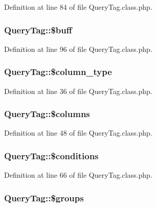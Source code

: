 Definition at line 84 of file Query\-Tag.\-class.\-php.

\hypertarget{classQueryTag_abe10d8fd334fac380dd5540b2c0bdcc8}{
\subsubsection[{\$buff}]{\setlength{\rightskip}{0pt plus 5cm}Query\-Tag\-::\$buff}}\label{classQueryTag_abe10d8fd334fac380dd5540b2c0bdcc8}


Definition at line 96 of file Query\-Tag.\-class.\-php.

\hypertarget{classQueryTag_a617db2d7a2db9fddba0959b43cc40458}{
\subsubsection[{\$column\-\_\-type}]{\setlength{\rightskip}{0pt plus 5cm}Query\-Tag\-::\$column\-\_\-type}}\label{classQueryTag_a617db2d7a2db9fddba0959b43cc40458}


Definition at line 36 of file Query\-Tag.\-class.\-php.

\hypertarget{classQueryTag_a375d57839b60d616ed27af9f42acd3a1}{
\subsubsection[{\$columns}]{\setlength{\rightskip}{0pt plus 5cm}Query\-Tag\-::\$columns}}\label{classQueryTag_a375d57839b60d616ed27af9f42acd3a1}


Definition at line 48 of file Query\-Tag.\-class.\-php.

\hypertarget{classQueryTag_a7cf9adc98dec4da0e67c1dcd25b7e5b5}{
\subsubsection[{\$conditions}]{\setlength{\rightskip}{0pt plus 5cm}Query\-Tag\-::\$conditions}}\label{classQueryTag_a7cf9adc98dec4da0e67c1dcd25b7e5b5}


Definition at line 66 of file Query\-Tag.\-class.\-php.

\hypertarget{classQueryTag_aa456465c5358ae400751727cd943683e}{
\subsubsection[{\$groups}]{\setlength{\rightskip}{0pt plus 5cm}Query\-Tag\-::\$groups}}\label{classQueryTag_aa456465c5358ae400751727cd943683e}


